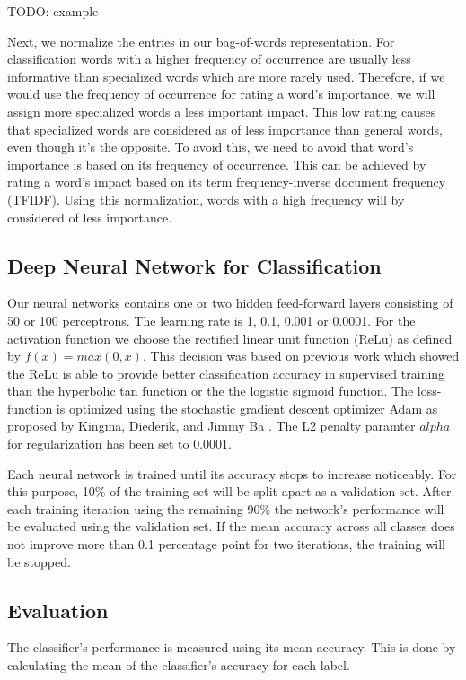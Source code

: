 \documentclass[sigconf]{acmart}
\begin{document}
TODO: example

Next, we normalize the entries in our bag-of-words representation. For classification words with a higher frequency of occurrence are usually less informative than specialized words which are more rarely used. Therefore, if we would use the frequency of occurrence for rating a word's importance, we will assign more specialized words a less important impact. This low rating causes that specialized words are considered as of less importance than general words, even though it's the opposite. To avoid this, we need to avoid that word's importance is based on its frequency of occurrence. This can be achieved by rating a word's impact based on its term frequency-inverse document frequency (TFIDF). Using this normalization, words with a high frequency will by considered of less importance.

\subsection{Deep Neural Network for Classification}

Our neural networks contains one or two hidden feed-forward layers consisting of 50 or 100 perceptrons. The learning rate is 1, 0.1, 0.001 or 0.0001. For the activation function we choose the rectified linear unit function (ReLu) as defined by $f(x) = max(0, x)$. This decision was based on previous work which showed the ReLu is able to provide better classification accuracy in supervised training than the hyperbolic tan function or the the logistic sigmoid function\cite{pmlr-v15-glorot11a}. The loss-function is optimized using the stochastic gradient descent optimizer Adam as proposed by Kingma, Diederik, and Jimmy Ba \cite{adam}. The L2 penalty paramter $alpha$ for regularization has been set to 0.0001.

Each neural network is trained until its accuracy stops to increase noticeably. For this purpose, 10\% of the training set will be split apart as a validation set. After each training iteration using the remaining 90\% the network's performance will be evaluated using the validation set. If the mean accuracy across all classes does not improve more than 0.1 percentage point for two iterations, the training will be stopped. 

\subsection{Evaluation}

The classifier's performance is measured using its mean accuracy. This is done by calculating the mean of the classifier's accuracy for each label.
\end{document}
